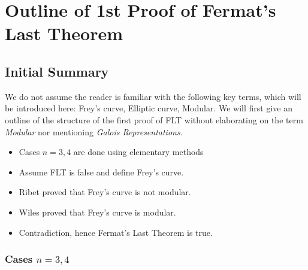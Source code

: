 \documentclass{article}
\newtheorem{theorem}{Theorem}[section]
\theoremstyle{definition}
\theoremstyle{definition}
\theoremstyle{definition}
\begin{document}
\section{Outline of 1st Proof of Fermat's Last Theorem}
\subsection{Initial Summary}

We do not assume the reader is familiar with the following key terms, which will be introduced here: Frey's curve, Elliptic curve, Modular.
\newline\newline
We will first give an outline of the structure of the first proof of FLT  without elaborating on the term \emph{Modular} nor mentioning \emph{Galois Representations}.


\begin{itemize}
\item Cases $n=3,4$ are done using elementary methods
\item Assume FLT is false and define Frey's curve.


\item Ribet proved that Frey's curve is not modular.



\item Wiles proved that Frey's curve is modular.
\item Contradiction, hence Fermat's Last Theorem is true.
\end{itemize}

\subsubsection{Cases $n=3,4$}
\end{document}
